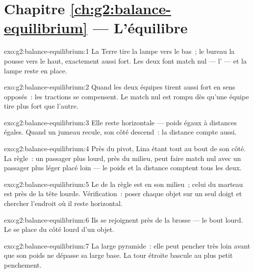 \section*{Chapitre \ref{ch:g2:balance-equilibrium} --- L'équilibre}

\begin{solution}{exo:g2:balance-equilibrium:1}
La Terre tire la lampe vers le bas~; le bureau la pousse vers le
haut, exactement aussi fort. Les deux  font match nul ---
l' --- et la lampe reste en place.
\end{solution}

\begin{solution}{exo:g2:balance-equilibrium:2}
Quand les deux équipes tirent aussi fort en sens opposés~: les
tractions se compensent. Le match nul est rompu dès qu'une équipe
tire plus fort que l'autre.
\end{solution}

\begin{solution}{exo:g2:balance-equilibrium:3}
Elle reste horizontale --- poids égaux à distances égales. Quand un
jumeau recule, son côté descend~: la distance compte aussi.
\end{solution}

\begin{solution}{exo:g2:balance-equilibrium:4}
Près du pivot, Lina étant tout au bout de son côté. La règle~: un
passager plus lourd, près du milieu, peut faire match nul avec un
passager plus léger placé loin --- le poids et la distance comptent
tous les deux.
\end{solution}

\begin{solution}{exo:g2:balance-equilibrium:5}
Le  de la règle est en son milieu~; celui du marteau
est près de la tête lourde. Vérification~: poser chaque objet sur un
seul doigt et chercher l'endroit où il reste horizontal.
\end{solution}

\begin{solution}{exo:g2:balance-equilibrium:6}
Ils se rejoignent près de la brosse --- le bout lourd. Le  se place du côté lourd d'un objet.
\end{solution}

\begin{solution}{exo:g2:balance-equilibrium:7}
La large pyramide~: elle peut pencher très loin avant que son poids
ne dépasse sa large base. La tour étroite bascule au plus petit
penchement.
\end{solution}

